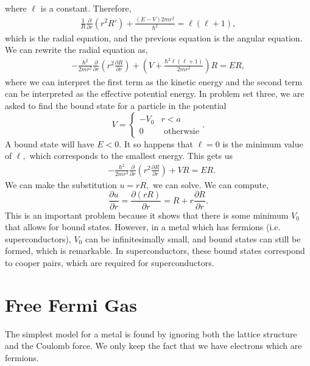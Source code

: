 \documentclass{article}
\numberwithin{equation}{section}
\begin{document}
where $\ell$ is a constant. Therefore, 
\begin{align}
    \frac{1}{R}\frac{\partial}{\partial r}(r^2R') + \frac{(E-V)2mr^2}{\hbar^2} = \ell(\ell + 1),
\end{align}
which is the radial equation, and the previous equation is the angular equation. We can rewrite the radial equation as,
\begin{align}
    -\frac{\hbar^2}{2mr^2}\frac{\partial}{\partial r}\left(r^2 \frac{\partial R}{\partial r}\right) + \left(V+\frac{\hbar^2\ell(\ell+1)}{2mr^2}\right)R=ER,
\end{align}
where we can interpret the first term as the kinetic energy and the second term can be interpreted as the effective potential energy. In problem set three, we are asked to find the bound state for a particle in the potential 
\begin{equation}
    V = \begin{cases}
        -V_0 & r<a \\ 
        0 & \text{ otherwsie}
    \end{cases}.
\end{equation}
A bound state will have $E<0.$ It so happens that $\ell=0$ is the minimum value of $\ell,$ which corresponds to the smallest energy. This gets us 
\begin{align}
    &-\frac{\hbar^2}{2mr^2}\frac{\partial}{\partial r}\left(r^2\frac{\partial R}{\partial r}\right) + VR = ER. 
\end{align}
We can make the substitution $u = rR,$ we can solve. We can compute,
\begin{equation}
    \frac{\partial u}{\partial r} = \frac{\partial (rR)}{\partial r} = R + r\frac{\partial R}{\partial r}.
\end{equation}
This is an important problem because it shows that there is some minimum $V_0$ that allows for bound states. However, in a metal which has fermions (i.e. superconductors), $V_0$ can be infinitesimally small, and bound states can still be formed, which is remarkable. In superconductors, these bound states correspond to cooper pairs, which are required for superconductors.
\section{Free Fermi Gas}
The simplest model for a metal is found by ignoring both the lattice structure and the Coulomb force. We only keep the fact that we have electrons which are fermions.
\end{document}
